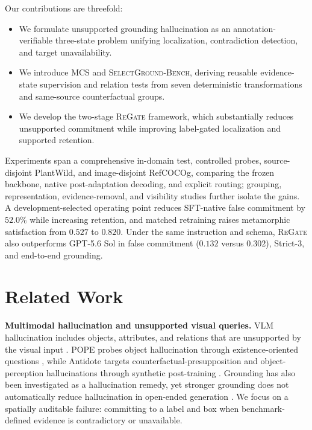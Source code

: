 \documentclass[letterpaper]{article}
\newcommand{\Bench}{\textsc{SelectGround-Bench}\xspace}
\newcommand{\Method}{\textsc{ReGate}\xspace}
\begin{document}
Our contributions are threefold:
\begin{itemize}
\item We formulate unsupported grounding hallucination as an annotation-verifiable three-state problem unifying localization, contradiction detection, and target unavailability.
\item We introduce MCS and \Bench, deriving reusable evidence-state supervision and relation tests from seven deterministic transformations and same-source counterfactual groups.
\item We develop the two-stage \Method framework, which substantially reduces unsupported commitment while improving label-gated localization and supported retention.
\end{itemize}

Experiments span a comprehensive in-domain test, controlled probes, source-disjoint PlantWild, and image-disjoint RefCOCOg, comparing the frozen backbone, native post-adaptation decoding, and explicit routing; grouping, representation, evidence-removal, and visibility studies further isolate the gains. A development-selected operating point reduces SFT-native false commitment by $52.0\%$ while increasing retention, and matched retraining raises metamorphic satisfaction from $0.527$ to $0.820$. Under the same instruction and schema, \Method also outperforms GPT-5.6 Sol in false commitment ($0.132$ versus $0.302$), Strict-3, and end-to-end grounding.


\section{Related Work}

\textbf{Multimodal hallucination and unsupported visual queries.}
VLM hallucination includes objects, attributes, and relations that are unsupported by the visual input \citep{li2023pope,bai2024hallucinationsurvey}. POPE probes object hallucination through existence-oriented questions \citep{li2023pope}, while Antidote targets counterfactual-presupposition and object-perception hallucinations through synthetic post-training \citep{wu2025antidote}. Grounding has also been investigated as a hallucination remedy, yet stronger grounding does not automatically reduce hallucination in open-ended generation \citep{geigle2024grounding}. We focus on a spatially auditable failure: committing to a label and box when benchmark-defined evidence is contradictory or unavailable.
\end{document}
